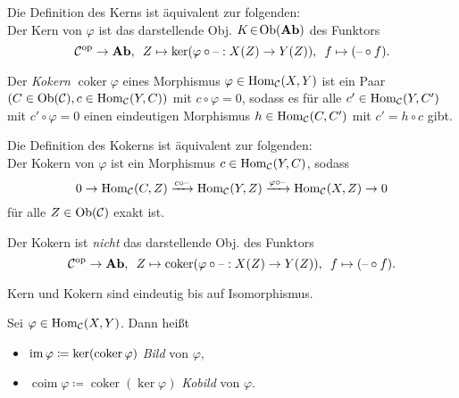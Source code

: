 \documentclass{cheat-sheet}
\DeclareMathOperator{\coker}{coker} %
\DeclareMathOperator{\coim}{coim} %
\begin{document}
\begin{bem}
  Die Definition des Kerns ist äquivalent zur folgenden: \\
  Der Kern von $\varphi$ ist das darstellende Obj. $K \!\in\! \operatorname{Ob}(\mathbf{Ab})$ des Funktors
  \[
    \mathcal{C}^{\mathrm{op}} \to \mathbf{Ab}, \enspace
    Z \mapsto \ker(\varphi \circ \text{--} : X(Z) \to Y(Z)), \enspace
    f \mapsto (\text{--} \circ f).
  \]
\end{bem}


\begin{defn}
  Der \emph{Kokern} $\coker \varphi$ eines Morphismus $\varphi \in \operatorname{Hom}_{\mathcal{C}}(X, Y)$ ist ein Paar $(C \in \operatorname{Ob}(\mathcal{C}), c \in \operatorname{Hom}_{\mathcal{C}}(Y, C))$ mit $c \circ \varphi = 0$, sodass es für alle $c' \in \operatorname{Hom}_{\mathcal{C}}(Y, C')$ mit $c' \circ \varphi = 0$ einen eindeutigen Morphismus $h \in \operatorname{Hom}_{\mathcal{C}}(C, C')$ mit $c' = h \circ c$ gibt.
\end{defn}


\begin{bem}
  Die Definition des Kokerns ist äquivalent zur folgenden: \\
  Der Kokern von $\varphi$ ist ein Morphismus $c \in \operatorname{Hom}_{\mathcal{C}}(Y, C)$, sodass
  \[ 0 \to \operatorname{Hom}_{\mathcal{C}}(C, Z) \xrightarrow{c \circ \text{--}} \operatorname{Hom}_{\mathcal{C}}(Y, Z) \xrightarrow{\varphi \circ \text{--}} \operatorname{Hom}_{\mathcal{C}}(X, Z) \to 0 \]
  für alle $Z \in \operatorname{Ob}(\mathcal{C})$ exakt ist.
\end{bem}

\begin{acht}
  Der Kokern ist {\em nicht} das darstellende Obj. des Funktors
  \[
    \Cat^\op \to \AbGrp, \enspace
    Z \mapsto \coker(\varphi \circ \blank : X(Z) \to Y(Z)), \enspace
    f \mapsto (\blank \circ f).
  \]
\end{acht}

\begin{bem}
  Kern und Kokern sind eindeutig bis auf Isomorphismus.
\end{bem}

\begin{defn}
  Sei $\varphi \in \operatorname{Hom}_{\mathcal{C}}(X, Y)$. Dann heißt
  \begin{itemize}
    \item $\im \varphi \coloneqq \ker(\coker \varphi)$ \emph{Bild} von $\varphi$,
    \item $\coim \varphi \coloneqq \coker(\ker \varphi)$ \emph{Kobild} von $\varphi$.
  \end{itemize}
\end{defn}
\end{document}
